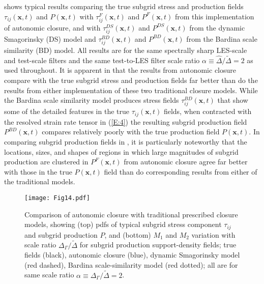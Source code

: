  shows typical results comparing the true subgrid stress and production fields $\tau_{ij}(\mathbf{x},t)$  and  $P(\mathbf{x},t)$ with  $\tau_{ij}^{F}(\mathbf{x},t)$  and  $P^{F}(\mathbf{x},t)$   from this implementation of autonomic closure, and with  $\tau_{ij}^{DS}(\mathbf{x},t)$  and  $P^{DS}(\mathbf{x},t)$   from the dynamic Smagorinsky (DS) model and   $\tau_{ij}^{BD}(\mathbf{x},t)$  and  $P^{BD}(\mathbf{x},t)$  from the Bardina scale similarity (BD) model. All results are for the same spectrally sharp LES-scale and test-scale filters and the same test-to-LES filter scale ratio $\alpha \equiv \widehat{\Delta}/ \widetilde{\Delta} = 2$  as used throughout. It is apparent in  that the results from autonomic closure compare with the true subgrid stress and production fields far better than do the results from either implementation of these two traditional closure models. While the Bardina scale similarity model produces stress fields  $\tau_{ij}^{BD}(\mathbf{x},t)$  that show some of the detailed features in the true $\tau_{ij}(\mathbf{x},t)$ fields, when contracted with the resolved strain rate tensor in (\ref{E:4}) the resulting subgrid production field $P^{BD}(\mathbf{x},t)$ compares relatively poorly with the true production field $P(\mathbf{x},t)$. In comparing subgrid production fields in , it is particularly noteworthy that the locations, sizes, and shapes of regions in which large magnitudes of subgrid production are clustered in $P^{F}(\mathbf{x},t)$  from autonomic closure agree far better with those in the true  $P(\mathbf{x},t)$ field than do corresponding results from either of the traditional models. 

%
\begin{figure}
	\begin{center}
	\texttt{[image: Fig14.pdf]}
	\caption{ Comparison of autonomic closure with traditional prescribed closure models, showing (top) pdfs of typical subgrid stress component $\tau_{ij}$ and subgrid production $P$, and (bottom) $M_1$ and $M_2$ variation with scale ratio $\Delta_{\Gamma} / \widetilde{\Delta}$ for subgrid production support-density fields; true fields (black), autonomic closure (blue), dynamic Smagorinsky model (red dashed), Bardina scale-similarity model (red dotted); all are for same scale ratio $\alpha \equiv \Delta_{\Gamma} / \widetilde{\Delta} = 2$.}
	\label{F:14}
	\end{center}
\end{figure}
%
%

